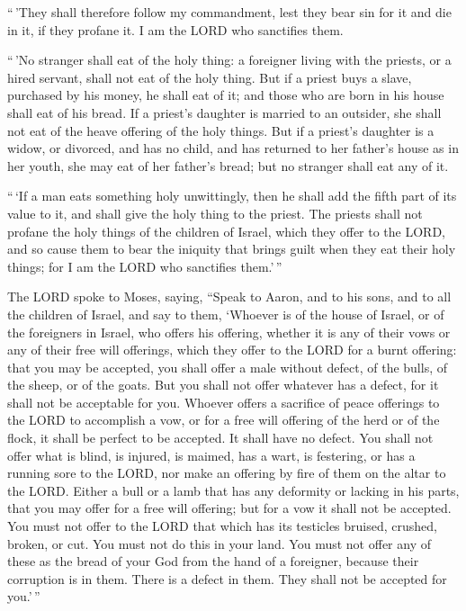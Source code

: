  ``\,'They shall therefore follow my commandment, lest they
bear sin for it and die in it, if they profane it. I am the LORD who
sanctifies them.

 ``\,'No stranger shall eat of the holy thing: a foreigner
living with the priests, or a hired servant, shall not eat of the holy
thing.  But if a priest buys a slave, purchased by his
money, he shall eat of it; and those who are born in his house shall eat
of his bread.  If a priest's daughter is married to an
outsider, she shall not eat of the heave offering of the holy things.
 But if a priest's daughter is a widow, or divorced, and
has no child, and has returned to her father's house as in her youth,
she may eat of her father's bread; but no stranger shall eat any of it.

 ``\,`If a man eats something holy unwittingly, then he
shall add the fifth part of its value to it, and shall give the holy
thing to the priest.  The priests shall not profane the
holy things of the children of Israel, which they offer to the LORD,
 and so cause them to bear the iniquity that brings guilt
when they eat their holy things; for I am the LORD who sanctifies
them.'\,''

 The LORD spoke to Moses, saying,  ``Speak to
Aaron, and to his sons, and to all the children of Israel, and say to
them, `Whoever is of the house of Israel, or of the foreigners in
Israel, who offers his offering, whether it is any of their vows or any
of their free will offerings, which they offer to the LORD for a burnt
offering:  that you may be accepted, you shall offer a male
without defect, of the bulls, of the sheep, or of the goats.
 But you shall not offer whatever has a defect, for it
shall not be acceptable for you.  Whoever offers a
sacrifice of peace offerings to the LORD to accomplish a vow, or for a
free will offering of the herd or of the flock, it shall be perfect to
be accepted. It shall have no defect.  You shall not offer
what is blind, is injured, is maimed, has a wart, is festering, or has a
running sore to the LORD, nor make an offering by fire of them on the
altar to the LORD.  Either a bull or a lamb that has any
deformity or lacking in his parts, that you may offer for a free will
offering; but for a vow it shall not be accepted.  You must
not offer to the LORD that which has its testicles bruised, crushed,
broken, or cut. You must not do this in your land.  You
must not offer any of these as the bread of your God from the hand of a
foreigner, because their corruption is in them. There is a defect in
them. They shall not be accepted for you.'\,''

